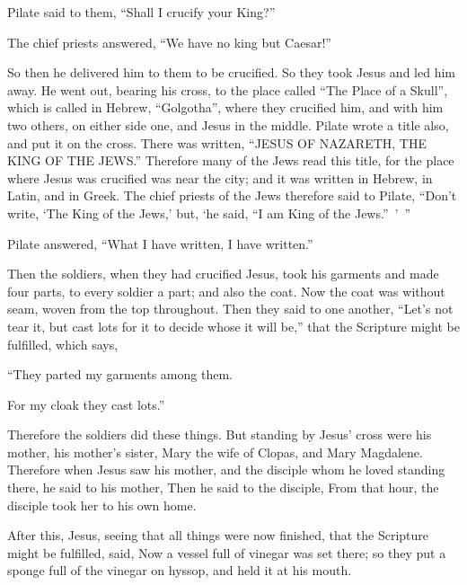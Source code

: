 {\par }{\PP Pilate said to them, “Shall I crucify your King?”
\par }{\PP The chief priests answered, “We have no king but Caesar!”
\par }{\PP {}So then he delivered him to them to be crucified. So they took Jesus and led him away.
He went out, bearing his cross, to the place called “The Place of a Skull”, which is called in Hebrew, “Golgotha”,
where they crucified him, and with him two others, on either side one, and Jesus in the middle.
Pilate wrote a title also, and put it on the cross. There was written, “JESUS OF NAZARETH, THE KING OF THE JEWS.”
Therefore many of the Jews read this title, for the place where Jesus was crucified was near the city; and it was written in Hebrew, in Latin, and in Greek.
The chief priests of the Jews therefore said to Pilate, “Don’t write, ‘The King of the Jews,’ but, ‘he said, “I am King of the Jews.” ’ ”
\par }{\PP {}Pilate answered, “What I have written, I have written.”
\par }{\PP {}Then the soldiers, when they had crucified Jesus, took his garments and made four parts, to every soldier a part; and also the coat. Now the coat was without seam, woven from the top throughout.
Then they said to one another, “Let’s not tear it, but cast lots for it to decide whose it will be,” that the Scripture might be fulfilled, which says,
\par }{\Q “They parted my garments among them.
\par }{\QB For my cloak they cast lots.”
\par }{\PP Therefore the soldiers did these things.
But standing by Jesus’ cross were his mother, his mother’s sister, Mary the wife of Clopas, and Mary Magdalene.
Therefore when Jesus saw his mother, and the disciple whom he loved standing there, he said to his mother,
{}
Then he said to the disciple,
{} From that hour, the disciple took her to his own home.
\par }{\PP {}After this, Jesus, seeing that all things were now finished, that the Scripture might be fulfilled, said,
{}
Now a vessel full of vinegar was set there; so they put a sponge full of the vinegar on hyssop, and held it at his mouth.
}
